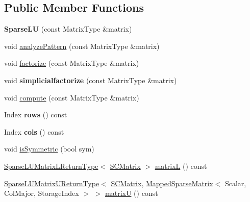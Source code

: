 \subsection*{Public Member Functions}
\begin{DoxyCompactItemize}
\item 
\mbox{\label{class_eigen_1_1_sparse_l_u_ac1678e57af46b42561cea4f149861164}} 
{\bfseries Sparse\+LU} (const Matrix\+Type \&matrix)
\item 
void \mbox{\hyperlink{class_eigen_1_1_sparse_l_u_aa907ff958c4f4855145091d2686f3a8a}{analyze\+Pattern}} (const Matrix\+Type \&matrix)
\item 
void \mbox{\hyperlink{class_eigen_1_1_sparse_l_u_a39858b0e72f2659d596364e252b34cbc}{factorize}} (const Matrix\+Type \&matrix)
\item 
\mbox{\label{class_eigen_1_1_sparse_l_u_a4841f300341aab4999881ce7f6e38b40}} 
void {\bfseries simplicialfactorize} (const Matrix\+Type \&matrix)
\item 
void \mbox{\hyperlink{class_eigen_1_1_sparse_l_u_a96a8dcb02015ab9be5777d4ba9173266}{compute}} (const Matrix\+Type \&matrix)
\item 
\mbox{\label{class_eigen_1_1_sparse_l_u_a5d4cc6663767bbed1efd278480ee2975}} 
Index {\bfseries rows} () const
\item 
\mbox{\label{class_eigen_1_1_sparse_l_u_a634e903f97c46b55591db2e12d1d45d1}} 
Index {\bfseries cols} () const
\item 
void \mbox{\hyperlink{class_eigen_1_1_sparse_l_u_afff3bd506cd78172e5219c707562729f}{is\+Symmetric}} (bool sym)
\item 
\mbox{\hyperlink{struct_eigen_1_1_sparse_l_u_matrix_l_return_type}{Sparse\+L\+U\+Matrix\+L\+Return\+Type}}$<$ \mbox{\hyperlink{class_eigen_1_1internal_1_1_mapped_super_nodal_matrix}{S\+C\+Matrix}} $>$ \mbox{\hyperlink{class_eigen_1_1_sparse_l_u_a634abe55e5a076f2e10db78871105a8f}{matrixL}} () const
\item 
\mbox{\hyperlink{struct_eigen_1_1_sparse_l_u_matrix_u_return_type}{Sparse\+L\+U\+Matrix\+U\+Return\+Type}}$<$ \mbox{\hyperlink{class_eigen_1_1internal_1_1_mapped_super_nodal_matrix}{S\+C\+Matrix}}, \mbox{\hyperlink{class_eigen_1_1_mapped_sparse_matrix}{Mapped\+Sparse\+Matrix}}$<$ Scalar, Col\+Major, Storage\+Index $>$ $>$ \mbox{\hyperlink{class_eigen_1_1_sparse_l_u_aaf395a8fca527144215ff19cc7b8b637}{matrixU}} () const

\end{DoxyCompactItemize}
